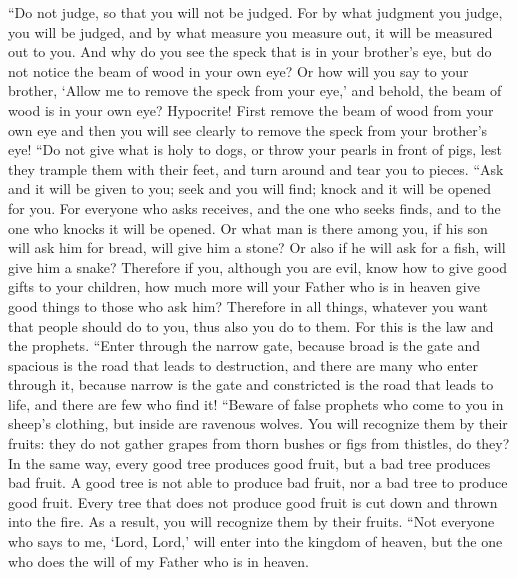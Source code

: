 \begin{biblechapter} %
 “Do not judge, so that you will not be judged.
\verse For by what judgment you judge, you will be judged, and by what measure you measure out, it will be measured out to you.
\verse And why do you see the speck that is in your brother’s eye, but do not notice the beam of wood in your own eye?
\verse Or how will you say to your brother, ‘Allow me to remove the speck from your eye,’ and behold, the beam of wood is in your own eye?
\verse Hypocrite! First remove the beam of wood from your own eye and then you will see clearly to remove the speck from your brother’s eye!
\verse “Do not give what is holy to dogs, or throw your pearls in front of pigs, lest they trample them with their feet, and turn around and tear you to pieces.
 “Ask and it will be given to you; seek and you will find; knock and it will be opened for you.
\verse For everyone who asks receives, and the one who seeks finds, and to the one who knocks it will be opened.
\verse Or what man is there among you, if his son will ask him for bread, will give him a stone?
\verse Or also if he will ask for a fish, will give him a snake?
\verse Therefore if you, although you are evil, know how to give good gifts to your children, how much more will your Father who is in heaven give good things to those who ask him?
\verse Therefore in all things, whatever you want that people should do to you, thus also you do to them. For this is the law and the prophets.
 “Enter through the narrow gate, because broad is the gate and spacious is the road that leads to destruction, and there are many who enter through it,
\verse because narrow is the gate and constricted is the road that leads to life, and there are few who find it!
 “Beware of false prophets who come to you in sheep’s clothing, but inside are ravenous wolves.
\verse You will recognize them by their fruits: they do not gather grapes from thorn bushes or figs from thistles, do they?
\verse In the same way, every good tree produces good fruit, but a bad tree produces bad fruit.
\verse A good tree is not able to produce bad fruit, nor a bad tree to produce good fruit.
\verse Every tree that does not produce good fruit is cut down and thrown into the fire.
\verse As a result, you will recognize them by their fruits.
 “Not everyone who says to me, ‘Lord, Lord,’ will enter into the kingdom of heaven, but the one who does the will of my Father who is in heaven.

\end{biblechapter}
